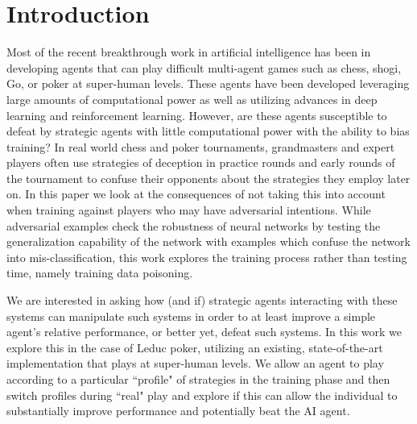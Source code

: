 \documentclass{article}
\begin{document}
\section{Introduction}
\label{Introduction}

Most of the recent breakthrough work in artificial intelligence has been in developing agents that can play difficult multi-agent games such as chess, shogi, Go, or poker at super-human levels. These agents have been developed leveraging large amounts of computational power as well as utilizing advances in deep learning and reinforcement learning. However, are these agents susceptible to defeat by strategic agents with little computational power with the ability to bias training? In real world chess and poker tournaments, grandmasters and expert players often use strategies of deception in practice rounds and early rounds of the tournament to confuse their opponents about the strategies they employ later on. In this paper we look at the consequences of not taking this into account when training against players who may have adversarial intentions. While adversarial examples check the robustness of neural networks by testing the generalization capability of the network with examples which confuse the network into mis-classification, this work explores the training process rather than testing time, namely training data poisoning. 

We are interested in asking how (and if) strategic agents interacting with these systems can manipulate such systems in order to at least improve a simple agent's relative performance, or better yet, defeat such systems. In this work we explore this in the case of Leduc poker, utilizing an existing, state-of-the-art implementation that plays at super-human levels. 
We allow an agent to play according to a particular ``profile" of strategies in the training phase and then switch profiles during ``real" play and explore if this can allow the individual to substantially improve performance and potentially beat the AI agent.
\end{document}
